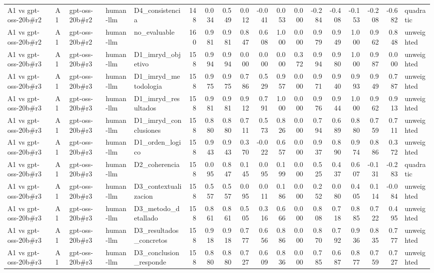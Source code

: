 \begin{table}
{\begin{tabular}{lllllrrrrrrrrrrrrl}
A1 vs gpt-oss-20b\#r2 & A1 & gpt-oss-20b\#r2 & human-llm & D4\_consistencia & 148 & 0.034 & 0.549 & 0.012 & -0.041 & 0.053 & 0.000 & -0.284 & -0.408 & -0.153 & -0.208 & -0.682 & quadratic \\
A1 vs gpt-oss-20b\#r2 & A1 & gpt-oss-20b\#r2 & human-llm & no\_evaluable & 160 & 0.981 & 0.981 & 0.847 & 0.608 & 1.000 & 0.000 & 0.979 & 0.949 & 1.000 & 0.962 & 0.848 & unweighted \\
A1 vs gpt-oss-20b\#r3 & A1 & gpt-oss-20b\#r3 & human-llm & D1\_imryd\_objetivo & 158 & 0.994 & 0.994 & 0.000 & 0.000 & 0.000 & 0.372 & 0.994 & 0.980 & 1.000 & 0.987 & 0.000 & unweighted \\
A1 vs gpt-oss-20b\#r3 & A1 & gpt-oss-20b\#r3 & human-llm & D1\_imryd\_metodologia & 158 & 0.975 & 0.975 & 0.786 & 0.529 & 0.957 & 0.000 & 0.971 & 0.940 & 0.993 & 0.949 & 0.787 & unweighted \\
A1 vs gpt-oss-20b\#r3 & A1 & gpt-oss-20b\#r3 & human-llm & D1\_imryd\_resultados & 158 & 0.981 & 0.981 & 0.912 & 0.791 & 1.000 & 0.000 & 0.976 & 0.944 & 1.000 & 0.962 & 0.913 & unweighted \\
A1 vs gpt-oss-20b\#r3 & A1 & gpt-oss-20b\#r3 & human-llm & D1\_imryd\_conclusiones & 158 & 0.880 & 0.880 & 0.711 & 0.573 & 0.826 & 0.000 & 0.794 & 0.689 & 0.880 & 0.759 & 0.711 & unweighted \\
A1 vs gpt-oss-20b\#r3 & A1 & gpt-oss-20b\#r3 & human-llm & D1\_orden\_logico & 158 & 0.943 & 0.943 & 0.370 & -0.022 & 0.657 & 0.000 & 0.937 & 0.890 & 0.974 & 0.886 & 0.372 & unweighted \\
A1 vs gpt-oss-20b\#r3 & A1 & gpt-oss-20b\#r3 & human-llm & D2\_coherencia & 158 & 0.095 & 0.847 & 0.145 & 0.095 & 0.199 & 0.000 & 0.525 & 0.437 & 0.607 & -0.131 & -0.283 & quadratic \\
A1 vs gpt-oss-20b\#r3 & A1 & gpt-oss-20b\#r3 & human-llm & D3\_contextualizacion & 158 & 0.557 & 0.557 & 0.095 & 0.011 & 0.186 & 0.000 & 0.252 & 0.080 & 0.405 & 0.114 & -0.084 & unweighted \\
A1 vs gpt-oss-20b\#r3 & A1 & gpt-oss-20b\#r3 & human-llm & D3\_metodo\_detallado & 158 & 0.861 & 0.861 & 0.505 & 0.316 & 0.666 & 0.000 & 0.808 & 0.718 & 0.885 & 0.722 & 0.495 & unweighted \\
A1 vs gpt-oss-20b\#r3 & A1 & gpt-oss-20b\#r3 & human-llm & D3\_resultados\_concretos & 158 & 0.918 & 0.918 & 0.777 & 0.656 & 0.886 & 0.000 & 0.870 & 0.792 & 0.936 & 0.835 & 0.777 & unweighted \\
A1 vs gpt-oss-20b\#r3 & A1 & gpt-oss-20b\#r3 & human-llm & D3\_conclusion\_responde & 158 & 0.880 & 0.880 & 0.727 & 0.609 & 0.836 & 0.000 & 0.785 & 0.687 & 0.877 & 0.759 & 0.727 & unweighted \\

\end{tabular}}
\end{table}
